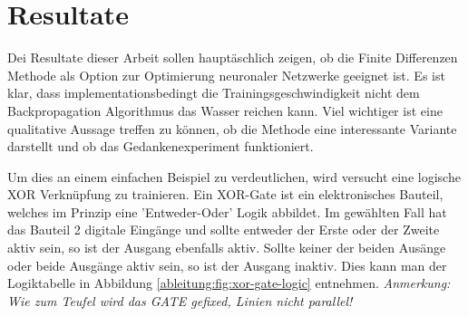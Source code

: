 \section{Resultate
	\label{ableitung:section:resultate}}
Dei Resultate dieser Arbeit sollen hauptäschlich zeigen, ob die Finite Differenzen Methode als Option zur Optimierung neuronaler Netzwerke geeignet ist. Es ist klar, dass implementationsbedingt die Trainingsgeschwindigkeit nicht dem Backpropagation Algorithmus das Wasser reichen kann. Viel wichtiger ist eine qualitative Aussage treffen zu können, ob die Methode eine interessante Variante darstellt und ob das Gedankenexperiment funktioniert.

Um dies an einem einfachen Beispiel zu verdeutlichen, wird versucht eine logische XOR Verknüpfung zu trainieren. Ein XOR-Gate ist ein elektronisches Bauteil, welches im Prinzip eine 'Entweder-Oder' Logik abbildet. Im gewählten Fall hat das Bauteil 2 digitale Eingänge und sollte entweder der Erste oder der Zweite aktiv sein, so ist der Ausgang ebenfalls aktiv. Sollte keiner der beiden Ausänge oder beide Ausgänge aktiv sein, so ist der Ausgang inaktiv. Dies kann man der Logiktabelle in Abbildung \ref{ableitung:fig:xor-gate-logic} entnehmen. \textit{Anmerkung: Wie zum Teufel wird das GATE gefixed, Linien nicht parallel!}

